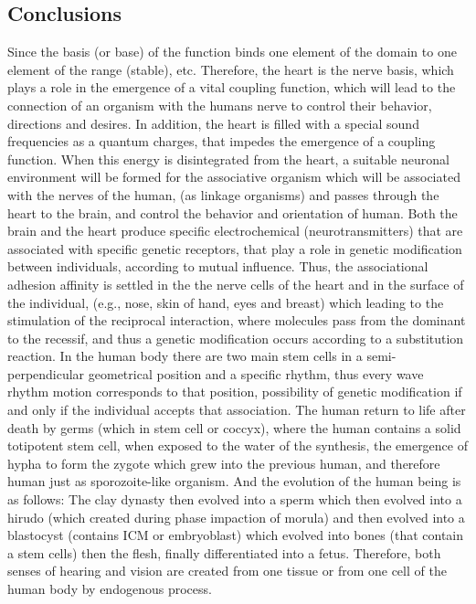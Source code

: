 \begin{Summary}
{{{{\section{Conclusions}
Since the basis (or base) of the function binds one element of the domain to one element of the range (stable), etc. Therefore, the heart is the nerve basis, which plays a role in the emergence of a vital coupling function, which will lead to the connection of an organism with the humans nerve to control their behavior, directions and desires. In addition, the heart is filled with a special sound frequencies as a quantum charges, that impedes the emergence of a coupling function. When this energy is disintegrated from the heart, a suitable neuronal environment will be formed for the associative organism which will be associated with the nerves of the human, (as linkage organisms) and passes through the heart to the brain, and control the behavior and orientation of human. 
Both the brain and the heart produce specific electrochemical (neurotransmitters) that are associated with specific genetic receptors, that play a role in genetic modification between individuals, according to mutual influence. 
Thus, the associational adhesion affinity is settled in the the nerve cells of the heart and in the surface of the individual, (e.g., nose, skin of hand, eyes and breast) which leading to the stimulation of the reciprocal interaction, where molecules pass from the dominant to the recessif, and thus a genetic modification occurs according to a substitution reaction.
In the human body there are two main stem cells in a semi-perpendicular geometrical position and a specific rhythm, thus every wave rhythm motion corresponds to that position, possibility of genetic modification if and only if the individual accepts that association.
The human return to life after death by germs (which in stem cell or coccyx), where the human contains a solid  totipotent stem cell, when exposed to the water of the synthesis, the emergence of hypha to form the zygote which grew into the previous human, and therefore human just as sporozoite-like organism. 
And the evolution of the human being is as follows:
The clay dynasty then evolved into a sperm which then evolved into a hirudo (which created during phase impaction of morula) and then evolved into a blastocyst (contains ICM or embryoblast) which evolved into bones (that contain a stem cells)  then the flesh, finally differentiated into a fetus. Therefore, both senses of hearing and vision are created from one tissue or from one cell of the human body by endogenous process.
}}}}
\end{Summary}
